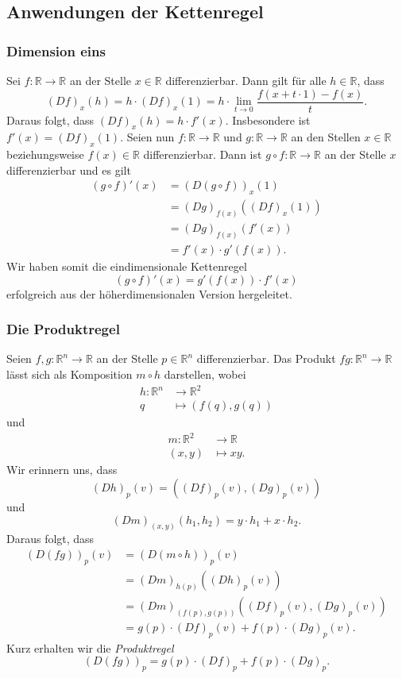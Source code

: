 \documentclass[../main.tex]{subfiles}
\begin{document}
\subsection*{Anwendungen der Kettenregel}
\subsubsection*{Dimension eins}
Sei $f \colon \mathbb{R} \to \mathbb{R}$ 
an der Stelle $x \in \mathbb{R}$ differenzierbar.
Dann gilt für alle $h \in \mathbb{R}$,
dass
\[
  {(Df)}_x(h) = h \cdot {(Df)}_x(1) = h \cdot
  \lim_{t \to 0} \frac{f(x + t \cdot 1) - f(x)}{t}.
\]
Daraus folgt, dass ${(Df)}_x(h) = h \cdot f'(x)$.
Insbesondere ist $f'(x) = {(Df)}_x(1)$.
Seien nun $f \colon \mathbb{R} \to \mathbb{R}$ und
$g \colon \mathbb{R} \to \mathbb{R}$ an den Stellen
$x \in \mathbb{R}$ beziehungsweise
$f(x) \in \mathbb{R}$ differenzierbar.
Dann ist $g \circ f \colon \mathbb{R} \to \mathbb{R}$ 
an der Stelle $x$ differenzierbar und es gilt
\begin{align*}
   {(g \circ f)}'(x)  
   & = {(D(g \circ f ))}_x(1) \\
   &={(Dg)}_{f(x)} ({(Df)}_x(1)) \\
   &  = {(Dg)}_{f(x)}(f'(x)) \\
   &= f'(x) \cdot g'(f(x)).
\end{align*}
Wir haben somit die eindimensionale Kettenregel
\[
  {(g \circ f)}'(x) = g'(f(x)) \cdot f'(x)
\]
erfolgreich aus der höherdimensionalen
Version hergeleitet.

\subsubsection*{Die Produktregel}
Seien $f, g \colon \mathbb{R}^n \to \mathbb{R}$ an der
Stelle $p \in \mathbb{R}^n$ differenzierbar.
Das Produkt $f g \colon \mathbb{R}^n \to \mathbb{R}$ 
lässt sich als Komposition
$m \circ h$ darstellen, wobei
\begin{align*}
  h \colon \mathbb{R}^n & \to \mathbb{R}^2 \\
  q & \mapsto (f(q), g(q))
\end{align*}
und
\begin{align*}
  m \colon \mathbb{R}^2 & \to \mathbb{R} \\
  (x, y) & \mapsto xy.
\end{align*}
Wir erinnern uns, dass
\[
  {(Dh)}_p(v) = ({(Df)}_p(v), {(Dg)}_p(v))
\]
und
\[
  {(Dm)}_{(x, y)} (h_1, h_2) = y \cdot h_1 + x \cdot h_2.
\]
Daraus folgt, dass
\begin{align*}
  {(D(fg))}_p(v) 
  &= {(D(m \circ h))}_p(v) \\
  &= {(Dm)}_{h(p)}({(Dh)}_p(v))\\
  &= {(Dm)}_{(f(p), g(p))} ({(Df)}_p(v), {(Dg)}_p(v)) \\
  &= g(p) \cdot {(Df)}_p(v) + f(p) \cdot {(Dg)}_p(v).
\end{align*}
Kurz erhalten wir die \emph{Produktregel}
\[
  {(D(fg))}_p = g(p) \cdot {(Df)}_p + f(p) \cdot {(Dg)}_p.
\]
\end{document}
